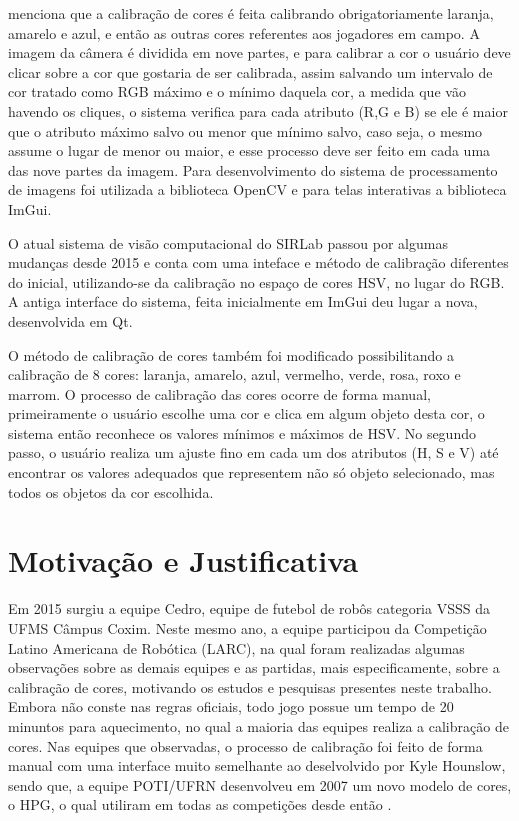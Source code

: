  menciona que a calibração de cores é feita calibrando obrigatoriamente laranja, amarelo e azul, e então as outras cores referentes aos jogadores em campo. A imagem da câmera é dividida em nove partes, e para calibrar a cor o usuário deve clicar sobre a cor que gostaria de ser calibrada, assim salvando um intervalo de cor tratado como RGB máximo e o mínimo daquela cor, a medida
que vão havendo os cliques, o sistema verifica para cada atributo (R,G e B) se ele é maior que o atributo
máximo salvo ou menor que mínimo salvo, caso seja, o mesmo assume o lugar de menor ou
maior, e esse processo deve ser feito em cada uma das nove partes da imagem. 
Para desenvolvimento do sistema de processamento de imagens foi utilizada a biblioteca OpenCV e para telas interativas a biblioteca ImGui.

O atual sistema de visão computacional do SIRLab passou por algumas mudanças desde 2015 e conta com uma inteface e método de calibração diferentes do inicial, utilizando-se da calibração no espaço de cores HSV, no lugar do RGB. A antiga interface do sistema, feita inicialmente em ImGui deu lugar a nova, desenvolvida em Qt\cite{VSSVision}.

O método de calibração de cores também foi modificado possibilitando a calibração de 8 cores: laranja, amarelo, azul, vermelho, verde, rosa, roxo e marrom\cite{VSSVision}. O processo de calibração das cores ocorre de forma manual, primeiramente o usuário escolhe uma cor e clica em algum objeto desta cor, o sistema então reconhece os valores  mínimos e máximos de HSV. No segundo passo, o usuário realiza um ajuste fino em cada um dos atributos (H, S e V) até encontrar os valores adequados que representem não só objeto selecionado, mas todos os objetos da cor escolhida.

\section{Motivação e Justificativa}
Em 2015 surgiu a equipe Cedro, equipe de futebol de robôs categoria VSSS da UFMS Câmpus Coxim. Neste mesmo ano, a equipe participou da Competição Latino Americana de Robótica (LARC), na qual foram realizadas algumas observações sobre as demais equipes e as partidas, mais especificamente, sobre a calibração de cores, motivando os estudos e pesquisas presentes neste trabalho. Embora não conste nas regras oficiais, todo jogo possue um tempo de 20 minuntos para aquecimento, no qual a maioria das equipes realiza a calibração de cores. Nas equipes que observadas, o processo de calibração foi feito de forma manual com uma interface muito semelhante ao deselvolvido por Kyle Hounslow\cite{YouTube}, sendo que, a equipe POTI/UFRN desenvolveu em 2007 um novo modelo de cores, o HPG, o qual utiliram em todas as competições desde então  \cite{Martins:2007,Mendes:2008}.


